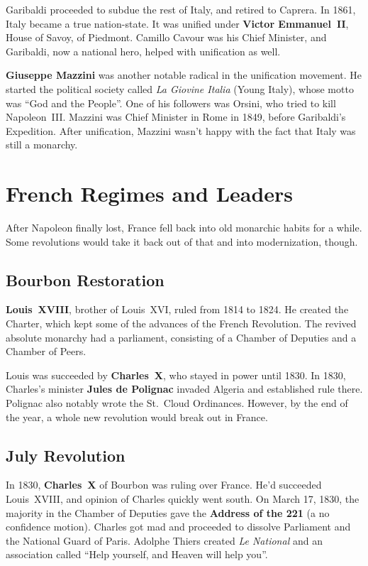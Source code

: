 Garibaldi proceeded to subdue the rest of Italy, and retired to Caprera.
In 1861, Italy became a true nation-state.
It was unified under \textbf{Victor Emmanuel~II}, House of Savoy, of Piedmont.
Camillo Cavour was his Chief Minister,
and Garibaldi, now a national hero, helped with unification as well.

\textbf{Giuseppe Mazzini} was another notable radical in the unification movement.
He started the political society called \textit{La Giovine Italia} (Young Italy),
whose motto was ``God and the People''.
One of his followers was Orsini, who tried to kill Napoleon~III\@.
Mazzini was Chief Minister in Rome in 1849, before Garibaldi's Expedition.
After unification, Mazzini wasn't happy with the fact that Italy was still a monarchy.

\section{French Regimes and Leaders}

After Napoleon finally lost, France fell back into old monarchic habits for a while.
Some revolutions would take it back out of that and into modernization, though.

\subsection*{Bourbon Restoration}

\textbf{Louis~XVIII}, brother of Louis~XVI, ruled from 1814 to 1824.
He created the Charter, which kept some of the advances of the French Revolution.
The revived absolute monarchy had a parliament, consisting of a Chamber of Deputies and a Chamber of Peers.

Louis was succeeded by \textbf{Charles~X}, who stayed in power until 1830.
In 1830, Charles's minister \textbf{Jules de Polignac} invaded Algeria and established rule there.
Polignac also notably wrote the St.\ Cloud Ordinances.
However, by the end of the year, a whole new revolution would break out in France.

\subsection*{July Revolution}

In 1830, \textbf{Charles~X} of Bourbon was ruling over France.
He'd succeeded Louis~XVIII, and opinion of Charles quickly went south.
On March 17, 1830,
the majority in the Chamber of Deputies gave the \textbf{Address of the 221} (a no confidence motion).
Charles got mad and proceeded to dissolve Parliament and the National Guard of Paris.
Adolphe Thiers created \textit{Le National} and an association called ``Help yourself, and Heaven will help you''.

